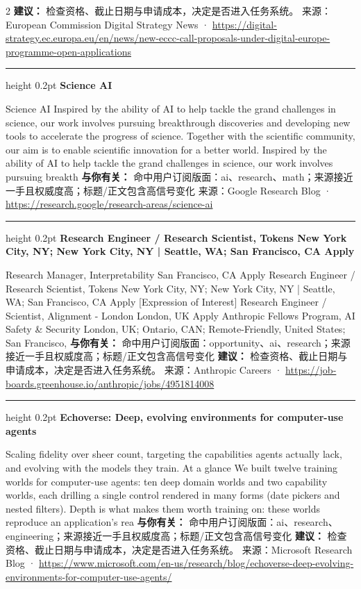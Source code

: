 \documentclass[10.5pt]{ctexart}
\begin{document}
\begin{multicols}{2}
\textbf{建议：} 检查资格、截止日期与申请成本，决定是否进入任务系统。
{\footnotesize\color{ormuted} 来源：European Commission Digital Strategy News · \url{https://digital-strategy.ec.europa.eu/en/news/new-eccc-call-proposals-under-digital-europe-programme-open-applications}}
\vspace{2mm}
\hrule height 0.2pt
\vspace{2mm}
{\large\bfseries Science AI}\par
Science AI Inspired by the ability of AI to help tackle the grand challenges in science, our work involves pursuing breakthrough discoveries and developing new tools to accelerate the progress of science. Together with the scientific community, our aim is to enable scientific innovation for a better world. Inspired by the ability of AI to help tackle the grand challenges in science, our work involves pursuing breakth
\textbf{与你有关：} 命中用户订阅版面：ai、research、math；来源接近一手且权威度高；标题/正文包含高信号变化
{\footnotesize\color{ormuted} 来源：Google Research Blog · \url{https://research.google/research-areas/science-ai}}
\vspace{2mm}
\hrule height 0.2pt
\vspace{2mm}
{\large\bfseries Research Engineer / Research Scientist, Tokens New York City, NY; New York City, NY | Seattle, WA; San Francisco, CA Apply}\par
[Expression of Interest] Research Manager, Interpretability San Francisco, CA Apply Research Engineer / Research Scientist, Tokens New York City, NY; New York City, NY | Seattle, WA; San Francisco, CA Apply [Expression of Interest] Research Engineer / Scientist, Alignment - London London, UK Apply Anthropic Fellows Program, AI Safety \& Security London, UK; Ontario, CAN; Remote-Friendly, United States; San Francisco, 
\textbf{与你有关：} 命中用户订阅版面：opportunity、ai、research；来源接近一手且权威度高；标题/正文包含高信号变化
\textbf{建议：} 检查资格、截止日期与申请成本，决定是否进入任务系统。
{\footnotesize\color{ormuted} 来源：Anthropic Careers · \url{https://job-boards.greenhouse.io/anthropic/jobs/4951814008}}
\vspace{2mm}
\hrule height 0.2pt
\vspace{2mm}
{\large\bfseries Echoverse: Deep, evolving environments for computer-use agents}\par
Scaling fidelity over sheer count, targeting the capabilities agents actually lack, and evolving with the models they train. At a glance We built twelve training worlds for computer-use agents: ten deep domain worlds and two capability worlds, each drilling a single control rendered in many forms (date pickers and nested filters). Depth is what makes them worth training on: these worlds reproduce an application’s rea
\textbf{与你有关：} 命中用户订阅版面：ai、research、engineering；来源接近一手且权威度高；标题/正文包含高信号变化
\textbf{建议：} 检查资格、截止日期与申请成本，决定是否进入任务系统。
{\footnotesize\color{ormuted} 来源：Microsoft Research Blog · \url{https://www.microsoft.com/en-us/research/blog/echoverse-deep-evolving-environments-for-computer-use-agents/}}
\end{multicols}
\end{document}
